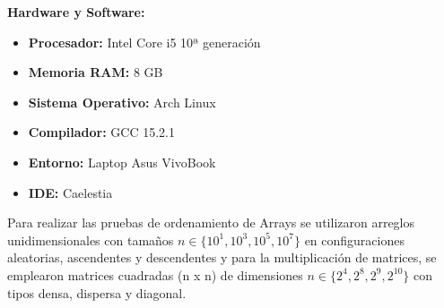 \begin{mdframed}
    \textbf{Hardware y Software:}
    \begin{itemize}
        \item \textbf{Procesador:} Intel Core i5 10ª generación
        \item \textbf{Memoria RAM:} 8 GB
        \item \textbf{Sistema Operativo:} Arch Linux
        \item \textbf{Compilador:} GCC 15.2.1
        \item \textbf{Entorno:} Laptop Asus VivoBook
        \item \textbf{IDE:} Caelestia
    \end{itemize}

    Para realizar las pruebas de ordenamiento de Arrays se utilizaron arreglos unidimensionales con tamaños $n \in \{10^1, 10^3, 10^5, 10^7\}$ en configuraciones aleatorias, ascendentes y descendentes y para la multiplicación de matrices, se emplearon matrices cuadradas (n x n) de dimensiones $n \in \{2^4, 2^8, 2^9, 2^{10}\}$ con tipos densa, dispersa y diagonal.
    
\end{mdframed}
